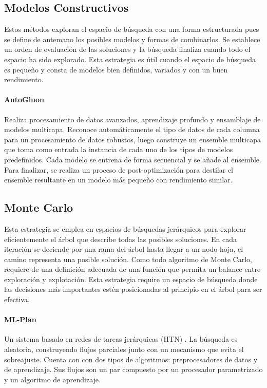 
\subsection{Modelos Constructivos}
Estos m\'etodos exploran el espacio de b\'usqueda con una forma estructurada pues se define de antemano los posibles modelos y formas de combinarlos. Se establece un orden de evaluaci\'on de las soluciones y la b\'usqueda finaliza cuando todo el espacio ha sido explorado. Esta estrategia es \'util cuando el espacio de b\'usqueda es peque\~no y consta de modelos bien definidos, variados y con un buen rendimiento.

\paragraph{AutoGluon } Realiza procesamiento de datos avanzados, aprendizaje profundo y ensamblaje de modelos multicapa. Reconoce autom\'aticamente el tipo de datos de cada columna para un procesamiento de datos robustos, luego construye un ensemble multicapa  que toma como entrada la instancia de cada uno de los tipos de modelos predefinidos. Cada modelo se entrena de forma secuencial y se a\~nade al ensemble. Para finalizar, se realiza un proceso de post-optimizaci\'on para destilar el ensemble resultante en un modelo m\'as peque\~no con rendimiento similar.

\subsection{Monte Carlo}
 Esta estrategia se emplea en espacios de b\'usquedas jer\'arquicos para explorar eficientemente el \'arbol que describe todas las  posibles soluciones. En cada iteraci\'on se deciende por una rama del \'arbol hasta llegar a un nodo hoja, el camino representa una posible soluci\'on. Como todo algoritmo de Monte Carlo, requiere de una definici\'on adecuada de una funci\'on que permita un balance entre exploraci\'on y explotaci\'on. Esta estrategia require un espacio de b\'usqueda donde las decisiones m\'as importantes est\'en posicionadas al principio en el \'arbol para ser efectiva.

 \paragraph{ML-Plan } Un sistema basado en redes de tareas jer\'arquicas (HTN) . La b\'usqueda es aleatoria, construyendo flujos parciales junto con un mecanismo que evita el sobreajuste. Cuenta con con dos tipos de algoritmos:  preprocesadores de datos y de aprendizaje. Sus flujos son un par compuesto por un procesador parametrizado y un algoritmo de aprendizaje.
    



